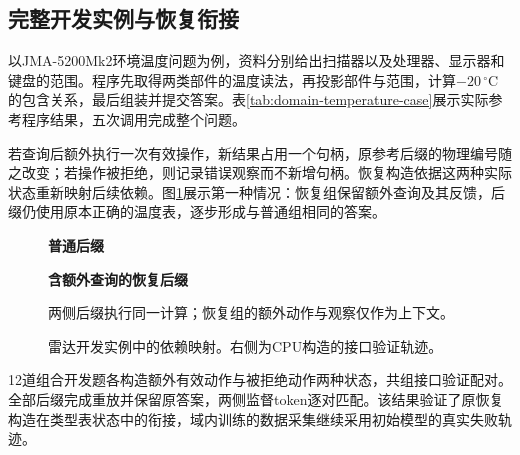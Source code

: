 \subsection{完整开发实例与恢复衔接}

以JMA-5200Mk2环境温度问题为例，资料分别给出扫描器以及处理器、显示器和键盘的范围\cite{source-v2-jrc-5200}。程序先取得两类部件的温度读法，再投影部件与范围，计算$-20\,^{\circ}\mathrm{C}$的包含关系，最后组装并提交答案。表\ref{tab:domain-temperature-case}展示实际参考程序结果，五次调用完成整个问题。

\begin{table}[htbp]
\centering\small
\caption{按部件温度规格计算的开发实例}
\label{tab:domain-temperature-case}
\OfflineTemperatureCaseTable
\end{table}

若查询后额外执行一次有效操作，新结果占用一个句柄，原参考后缀的物理编号随之改变；若操作被拒绝，则记录错误观察而不新增句柄。恢复构造依据这两种实际状态重新映射后续依赖。图\ref{fig:domain-recovery-case}展示第一种情况：恢复组保留额外查询及其反馈，后缀仍使用原本正确的温度表，逐步形成与普通组相同的答案。

\begin{figure}[htbp]
\centering\small
{}
\par\vspace{0.6em}
\begin{minipage}[t]{0.45\textwidth}
\centering
\textbf{普通后缀}\par\vspace{0.5em}
\end{minipage}\hfill
\begin{minipage}[t]{0.45\textwidth}
\centering
\textbf{含额外查询的恢复后缀}\par\vspace{0.5em}
\end{minipage}
\par\vspace{0.7em}
两侧后缀执行同一计算；恢复组的额外动作与观察仅作为上下文。
\caption{雷达开发实例中的依赖映射。右侧为CPU构造的接口验证轨迹。}
\label{fig:domain-recovery-case}
\end{figure}

12道组合开发题各构造额外有效动作与被拒绝动作两种状态，共\OfflineRecoveryPairs{}组接口验证配对。全部后缀完成重放并保留原答案，两侧监督token逐对匹配。该结果验证了原恢复构造在类型表状态中的衔接，域内训练的数据采集继续采用初始模型的真实失败轨迹。
